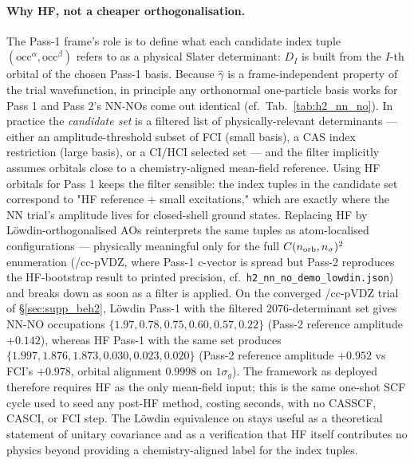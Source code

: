 \documentclass[journal=jctcce,manuscript=suppinfo,layout=traditional]{achemso}
\begin{document}
\paragraph{Why HF, not a cheaper orthogonalisation.}
The Pass-1 frame's role is to define what each candidate index tuple
$(\mathrm{occ}^\alpha, \mathrm{occ}^\beta)$ refers to as a physical
Slater determinant: $D_I$ is built from the $I$-th orbital of the
chosen Pass-1 basis. Because $\widehat\gamma$ is a frame-independent
property of the trial wavefunction, in principle any orthonormal
one-particle basis works for Pass 1 and Pass 2's NN-NOs come out
identical (cf.\ Tab.~\ref{tab:h2_nn_no}). In practice the
\emph{candidate set} is a filtered list of physically-relevant
determinants --- either an amplitude-threshold subset of FCI (small
basis), a CAS index restriction (large basis), or a CI/HCI selected
set --- and the filter implicitly assumes orbitals close to a
chemistry-aligned mean-field reference. Using HF orbitals for Pass 1
keeps the filter sensible: the index tuples in the candidate set
correspond to "HF reference + small excitations," which are exactly
where the NN trial's amplitude lives for closed-shell ground
states. Replacing HF by L\"owdin-orthogonalised AOs reinterprets the
same tuples as atom-localised configurations --- physically
meaningful only for the full $C(n_{\rm orb}, n_\sigma)^2$ enumeration
(/cc-pVDZ, where Pass-1 c-vector is spread but Pass-2 reproduces
the HF-bootstrap result to printed precision, cf.\
\texttt{h2\_nn\_no\_demo\_lowdin.json}) and breaks down as soon as a
filter is applied. On the converged \ce{BeH2}/cc-pVDZ trial of
\S\ref{sec:supp_beh2}, L\"owdin Pass-1 with the filtered
$2076$-determinant set gives NN-NO occupations
$\{1.97, 0.78, 0.75, 0.60, 0.57, 0.22\}$ (Pass-2 reference amplitude
$+0.142$), whereas HF Pass-1 with the same set produces
$\{1.997, 1.876, 1.873, 0.030, 0.023, 0.020\}$ (Pass-2 reference
amplitude $+0.952$ vs FCI's $+0.978$, orbital alignment $0.9998$ on
$1\sigma_g$). The framework as deployed therefore requires HF as the
only mean-field input; this is the same one-shot SCF cycle used to
seed any post-HF method, costing seconds, with no CASSCF, CASCI,
or FCI step. The L\"owdin equivalence on \ce{H2} stays useful as a
theoretical statement of unitary covariance and as a verification
that HF itself contributes no physics beyond providing a
chemistry-aligned label for the index tuples.

\end{document}
